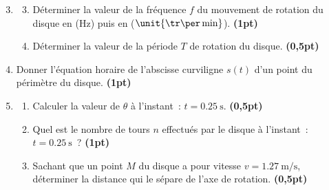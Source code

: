\begin{enumerate}
    \setcounter{enumi}{2}
    \item[]
          \begin{enumerate}
              \setcounter{enumii}{2}
              \item Déterminer la valeur de la fréquence $f$ du mouvement de
                    rotation du disque en ($\unit{\Hz}$) puis en
                    ($\unit{\tr\per\min}$). \textbf{(1pt)}
              \item Déterminer la valeur de la période $T$ de rotation du
                    disque. \textbf{(0,5pt)}
          \end{enumerate}
    \item Donner l'équation horaire de l'abscisse curviligne $s(t)$ d'un point
          du périmètre du disque. \textbf{(1pt)}
    \item
          \begin{enumerate}
              \item Calculer la valeur de $\theta$ à l'instant~:
                    $t=\qty{0,25}{\second}$. \textbf{(0,5pt)}
              \item Quel est le nombre de tours $n$ effectués par le disque à
                    l'instant~: $t=\qty{0,25}{\second}$~? \textbf{(1pt)}
              \item Sachant que un point $M$ du disque a pour vitesse
                    $v=\qty{1,27}{\meter\per\s}$, déterminer la distance qui le
                    sépare de l'axe de rotation. \textbf{(0,5pt)}
          \end{enumerate}
\end{enumerate}
